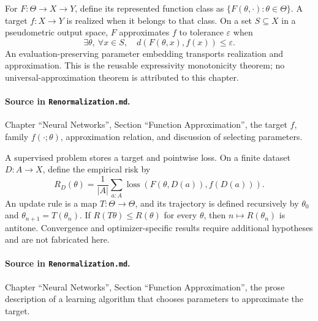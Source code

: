 \begin{definition}
\label{def:renorm:learningVocabulary}
For $F:\Theta\to X\to Y$, define its represented function class as
$\{F(\theta,\cdot):\theta\in\Theta\}$.  A target $f:X\to Y$ is realized when it belongs to that
class.  On a set $S\subseteq X$ in a pseudometric output space, $F$ approximates $f$ to tolerance
$\varepsilon$ when
\[
  \exists\theta,\ \forall x\in S,\quad d(F(\theta,x),f(x))\le\varepsilon.
\]
An evaluation-preserving parameter embedding transports realization and approximation.  This is
the reusable expressivity monotonicity theorem; no universal-approximation theorem is attributed to
this chapter.

\paragraph{Source in \texttt{Renormalization.md}.}
Chapter ``Neural Networks'', Section ``Function Approximation'', the target $f$, family
$f(\mathord\cdot;\theta)$, approximation relation, and discussion of selecting parameters.
\end{definition}

\begin{definition}
\label{def:renorm:updateRule}
A supervised problem stores a target and pointwise loss.  On a finite dataset $D:A\to X$, define
the empirical risk by
\[
  R_D(\theta)=\frac1{|A|}\sum_{a:A}
    \operatorname{loss}(F(\theta,D(a)),f(D(a))).
\]
An update rule is a map $T:\Theta\to\Theta$, and its trajectory is defined recursively by
$\theta_0$ and $\theta_{n+1}=T(\theta_n)$.  If $R(T\theta)\le R(\theta)$ for every $\theta$, then
$n\mapsto R(\theta_n)$ is antitone.  Convergence and optimizer-specific results require additional
hypotheses and are not fabricated here.

\paragraph{Source in \texttt{Renormalization.md}.}
Chapter ``Neural Networks'', Section ``Function Approximation'', the prose description of a
learning algorithm that chooses parameters to approximate the target.
\end{definition}

